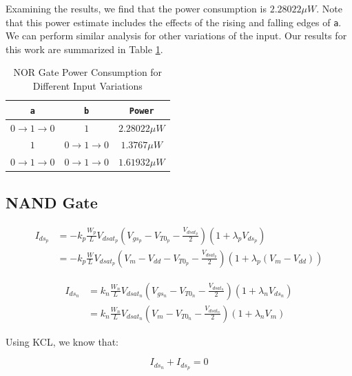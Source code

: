 \documentclass[fleqn]{article}
\begin{document}
	\noindent Examining the results, we find that the power consumption is $2.28022{\mu}W$. Note that this power estimate includes the effects of the rising and falling edges of \texttt{a}. We can perform similar analysis for other variations of the input. Our results for this work are summarized in Table \ref{table::nor_gate_power_analysis}.
	
	\begin{table}[H]
	\begin{center}
	\caption{NOR Gate Power Consumption for Different Input Variations}
	\label{table::nor_gate_power_analysis}
	\begin{tabular}{| c | c | c |}
		\hline
		\texttt{a} & \texttt{b} & \texttt{Power}\\
		\hline	
		$0 \rightarrow 1 \rightarrow 0$ & $1$ & $2.28022{\mu}W$ \\
		\hline	
		$1$ & $0 \rightarrow 1 \rightarrow 0$ & $1.3767{\mu}W$ \\
		\hline	
		$0 \rightarrow 1 \rightarrow 0$ & $0 \rightarrow 1 \rightarrow 0$ & $1.61932{\mu}W$\\
		\hline
	\end{tabular}
	\end{center}
	\end{table}
	
	\subsection{NAND Gate}

	\begin{align}
		I_{ds_p} &= -k_p\frac{W_p}{L}V_{dsat_p}\left(V_{gs_p} - V_{T0_p} - \frac{V_{dsat_p}}{2}\right)\left(1 + {\lambda_p}V_{ds_p}\right) \\
		&= -k_p\frac{W}{L}V_{dsat_p}\left(V_m - V_{dd} - V_{T0_p} - \frac{V_{dsat_p}}{2}\right)\left(1 + {\lambda_p}(V_m - V_{dd})\right)
	\end{align}
	
	\begin{align}
		I_{ds_n} &= k_n\frac{W_n}{L}V_{dsat_n}\left(V_{gs_n} - V_{T0_n} - \frac{V_{dsat_n}}{2}\right)\left(1 + {\lambda_n}V_{ds_n}\right) \\
		&= k_n\frac{W_n}{L}V_{dsat_n}\left(V_m - V_{T0_n} - \frac{V_{dsat_n}}{2}\right)\left(1 + {\lambda_n}V_m\right)
	\end{align}
	
	Using KCL, we know that:
	
	\begin{equation}
		I_{ds_n} + I_{ds_p} = 0
	\end{equation}
	
\end{document}
